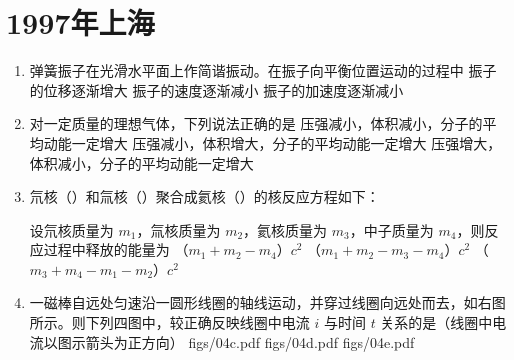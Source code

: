 \documentclass[\gkver]{gaokaozhenti}
\begin{document}
\chapter{1997年上海}

\begin{enumerate}
\item
弹簧振子在光滑水平面上作简谐振动。在振子向平衡位置运动的过程中
{振子的位移逐渐增大}
{振子的速度逐渐减小}
{振子的加速度逐渐减小}


\item
对一定质量的理想气体，下列说法正确的是
{压强减小，体积减小，分子的平均动能一定增大}
{压强减小，体积增大，分子的平均动能一定增大}
{压强增大，体积减小，分子的平均动能一定增大}


\item
氘核（）和氚核（）聚合成氦核（）的核反应方程如下：


设氘核质量为 $m_{1}$，氚核质量为 $m_{2}$，氦核质量为 $m_{3}$，中子质量为 $m_{4}$，则反应过程中释放的能量为
{（$m_{1} + m_{2} - m_{4}$）$c^{2}$}
{（$m_{1} + m_{2} - m_{3} - m_{4}$）$c^{2}$}
{（$m_{3} + m_{4} - m_{1} - m_{2}$）$c^{2}$}


\item
一磁棒自远处匀速沿一圆形线圈的轴线运动，并穿过线圈向远处而去，如右图所示。则下列四图中，较正确反映线圈中电流 $i$ 与时间 $t$ 关系的是（线圈中电流以图示箭头为正方向）
\onepicture[w=5.00cm]{}
{figs/04c.pdf}
{figs/04d.pdf}
{figs/04e.pdf}


\end{enumerate}
\end{document}

